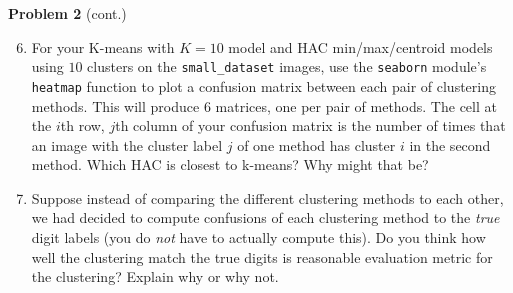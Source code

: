 \documentclass[submit]{harvardml}
\begin{document}
\newpage
\begin{framed}
\noindent\textbf{Problem 2} (cont.)\\
\begin{enumerate}
\setcounter{enumi}{5}
\item For your K-means with $K = 10$ model and HAC min/max/centroid
  models using $10$ clusters on the \texttt{small\_dataset} images,
  use the \texttt{seaborn} module's \texttt{heatmap} function to plot
  a confusion matrix between each pair of clustering methods.  This
  will produce 6 matrices, one per pair of methods. The cell at the
  $i$th row, $j$th column of your confusion matrix is the number of
  times that an image with the cluster label $j$ of one method has
  cluster $i$ in the second method.  Which HAC is closest to k-means?
  Why might that be?

\item Suppose instead of comparing the different clustering methods to
  each other, we had decided to compute confusions of each clustering
  method to the \emph{true} digit labels (you do \emph{not} have to
  actually compute this).  Do you think how well the clustering match
  the true digits is reasonable evaluation metric for the clustering?
  Explain why or why not.
  
\end{enumerate}
\end{framed}

\newpage
\end{document}
